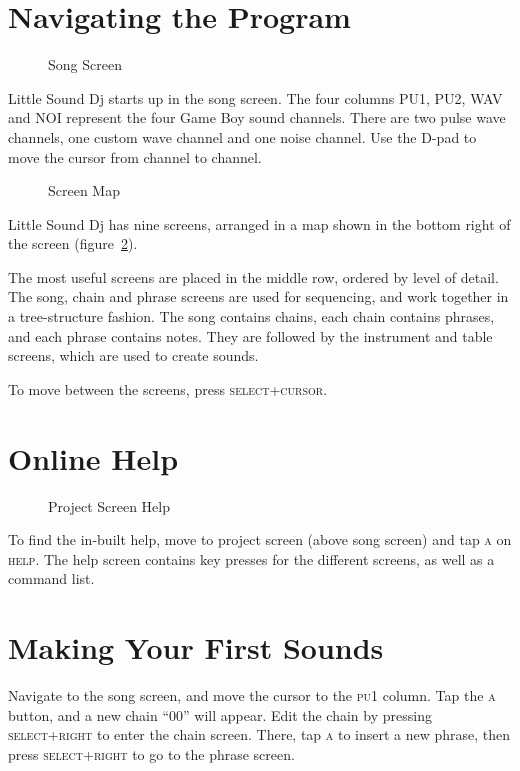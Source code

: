 \section{Navigating the Program}

\begin{figure}[hbtp]
\centering
{}
\caption{Song Screen}
\label{fig:song}
\end{figure}

Little Sound Dj starts up in the song screen.
The four columns \textsc{PU1, PU2, WAV} and \textsc{NOI} represent the four Game Boy sound channels.
There are two pulse wave channels, one custom wave channel and one noise channel.
Use the D-pad to move the cursor from channel to channel.

\begin{figure}[hbtp]
\centering
{}
\caption{Screen Map}
\label{fig:map}
\end{figure}

Little Sound Dj has nine screens, arranged in a map shown in the
bottom right of the screen (figure~\ref{fig:map}). 

The most useful screens are placed in the middle row, ordered by level of detail. 
The song, chain and phrase screens are used for sequencing, and work together in a tree-structure
fashion.  The song contains chains, each chain contains phrases, and each phrase contains notes.
They are followed by the instrument and table screens, which are used to create sounds.

To move between the screens, press \textsc{select+cursor}.

\section{Online Help}

\begin{figure}[hbtp]
	\centering
	\caption{Project Screen Help}
\end{figure}

To find the in-built help, move to project screen (above song screen) and tap \textsc{a} on \textsc{help}.
The help screen contains key presses for the different screens, as well as a command list.

\section{Making Your First Sounds}
Navigate to the song screen, and move the cursor to the \textsc{pu1} column. Tap the \textsc{a} button,
and a new chain ``00'' will appear.
Edit the chain by pressing \textsc{select+right} to enter the chain screen.
There, tap \textsc{a} to insert a new phrase, then press \textsc{select+right} to go to the phrase screen.

